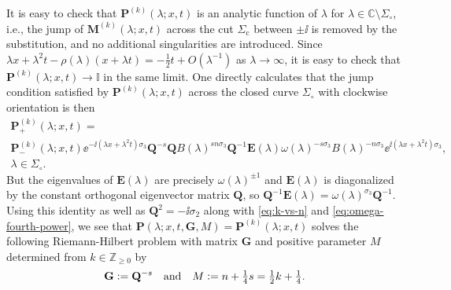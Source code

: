 It is easy to check that $\mathbf{P}^{(k)}(\lambda;x,t)$ is an analytic function of $\lambda$ for $\lambda\in\mathbb{C}\setminus\Sigma_\circ$, i.e., the jump of $\mathbf{M}^{(k)}(\lambda;x,t)$ across the cut $\Sigma_\mathrm{c}$ between $\pm\ii$ is removed by the substitution, and no additional singularities are introduced.  Since $\lambda x+\lambda^2t-\rho(\lambda)(x+\lambda t) = -\tfrac{1}{2}t+O(\lambda^{-1})$ as $\lambda\to\infty$, it is easy to check that $\mathbf{P}^{(k)}(\lambda;x,t)\to\mathbb{I}$ in the same limit.  One directly calculates that the jump condition satisfied by $\mathbf{P}^{(k)}(\lambda;x,t)$ across the closed curve $\Sigma_\circ$ with clockwise orientation is then
\begin{multline}
\mathbf{P}^{(k)}_+(\lambda;x,t)=\\
\mathbf{P}^{(k)}_-(\lambda;x,t)\ee^{-\ii(\lambda x+\lambda^2t)\sigma_3}\mathbf{Q}^{-s}\mathbf{Q}
B(\lambda)^{sn\sigma_3}
\mathbf{Q}^{-1}\mathbf{E}(\lambda)\omega(\lambda)^{-s\sigma_3}
B(\lambda)^{-n\sigma_3}
\ee^{\ii(\lambda x+\lambda^2t)\sigma_3},\\
\lambda\in\Sigma_\circ.
\end{multline}
But the eigenvalues of $\mathbf{E}(\lambda)$ are precisely $\omega(\lambda)^{\pm 1}$ and $\mathbf{E}(\lambda)$ is diagonalized by the constant orthogonal eigenvector matrix $\mathbf{Q}$, so $\mathbf{Q}^{-1}\mathbf{E}(\lambda)=\omega(\lambda)^{\sigma_3}\mathbf{Q}^{-1}$.  Using this identity as well as $\mathbf{Q}^2=-\ii\sigma_2$ along with \eqref{eq:k-vs-n} and \eqref{eq:omega-fourth-power}, we see that $\mathbf{P}(\lambda;x,t,\mathbf{G},M)=\mathbf{P}^{(k)}(\lambda;x,t)$ solves the following Riemann-Hilbert problem with matrix $\mathbf{G}$ and positive parameter $M$ determined from $k\in\mathbb{Z}_{\ge 0}$ by
\begin{equation}
\mathbf{G}\vcentcolon= \mathbf{Q}^{-s}\quad\text{and}\quad  M\vcentcolon= n+\tfrac{1}{4}s=\tfrac{1}{2}k+\tfrac{1}{4}.
\label{eq:G-and-M-RogueWaves}
\end{equation}
